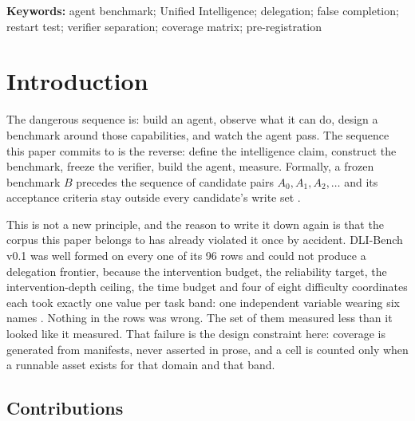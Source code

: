 \begin{abstract}
and the validity requirements --- specification--key tests, concordance audits, graded scoring, headroom, termination reasons --- that every future binding must meet, because the benchmark this one replaces was well formed on every row and could not draw a frontier.
\end{abstract}

\noindent\textbf{Keywords:} agent benchmark; Unified Intelligence; delegation; false completion; restart test; verifier separation; coverage matrix; pre-registration

\tableofcontents
\bigskip

\section{Introduction}\label{sec:intro}

The dangerous sequence is: build an agent, observe what it can do, design a benchmark around those capabilities, and watch the agent pass. The sequence this paper commits to is the reverse: define the intelligence claim, construct the benchmark, freeze the verifier, build the agent, measure. Formally, a frozen benchmark $B$ precedes the sequence of candidate pairs $A_0, A_1, A_2, \ldots$ and its acceptance criteria stay outside every candidate's write set \citep{yang2026plan}.

This is not a new principle, and the reason to write it down again is that the corpus this paper belongs to has already violated it once by accident. DLI-Bench v0.1 was well formed on every one of its 96 rows and could not produce a delegation frontier, because the intervention budget, the reliability target, the intervention-depth ceiling, the time budget and four of eight difficulty coordinates each took exactly one value per task band: one independent variable wearing six names \citep{yang2026dlibench}. Nothing in the rows was wrong. The set of them measured less than it looked like it measured. That failure is the design constraint here: coverage is generated from manifests, never asserted in prose, and a cell is counted only when a runnable asset exists for that domain and that band.

\subsection{Contributions}

